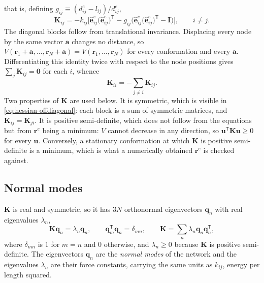 \documentclass[11pt]{article}
\newcommand{\rr}{\mathbf{r}}
\newcommand{\ee}{\hat{\mathbf{e}}}
\newcommand{\KK}{\mathbf{K}}
\newcommand{\re}{\rr^{e}}
\newcommand{\eeije}{\ee^{e}_{ij}}
\newcommand{\dije}{d^{e}_{ij}}
\newcommand{\gij}{g_{ij}}
\newcommand{\lij}{l_{ij}}
\newcommand{\kij}{k_{ij}}
\begin{document}
that is, defining $\gij \equiv (\dije - \lij)/\dije$,
\begin{equation}
\boxed{
\KK_{ij} = -\kij\Big[\eeije\big(\eeije\big)^{\mathsf T}
- \gij\Big(\eeije\big(\eeije\big)^{\mathsf T} - \mathbf{I}\Big)\Big],
\qquad i \ne j.
}
\label{eq:hessian-offdiagonal}
\end{equation}
The diagonal blocks follow from translational invariance.
Displacing every node by the same vector $\mathbf{a}$ changes no distance, so $V(\rr_1+\mathbf{a},\ldots,\rr_N+\mathbf{a}) = V(\rr_1,\ldots,\rr_N)$ for every conformation and every $\mathbf{a}$.
Differentiating this identity twice with respect to the node positions gives $\sum_j \KK_{ij} = \mathbf{0}$ for each $i$, whence
\begin{equation}
\boxed{
\KK_{ii} = -\sum_{j \ne i} \KK_{ij}.
}
\label{eq:hessian-diagonal}
\end{equation}
Two properties of $\KK$ are used below.
It is symmetric, which is visible in \eqref{eq:hessian-offdiagonal}: each block is a sum of symmetric matrices, and $\KK_{ij} = \KK_{ji}$.
It is positive semi-definite, which does not follow from the equations but from $\re$ being a minimum: $V$ cannot decrease in any direction, so $\mathbf{u}^{\mathsf T}\KK\mathbf{u} \ge 0$ for every $\mathbf{u}$.
Conversely, a stationary conformation at which $\KK$ is positive semi-definite is a minimum, which is what a numerically obtained $\re$ is checked against.



\subsection{Normal modes}
\label{sec:modes}

$\KK$ is real and symmetric, so it has $3N$ orthonormal eigenvectors $\mathbf{q}_n$ with real eigenvalues $\lambda_n$,
\begin{equation}
\KK \mathbf{q}_n = \lambda_n \mathbf{q}_n,
\qquad
\mathbf{q}_m^{\mathsf T} \mathbf{q}_n = \delta_{mn},
\qquad
\KK = \sum_n \lambda_n \mathbf{q}_n \mathbf{q}_n^{\mathsf T},
\label{eq:eigenproblem}
\end{equation}
where $\delta_{mn}$ is $1$ for $m=n$ and $0$ otherwise, and $\lambda_n \ge 0$ because $\KK$ is positive semi-definite.
The eigenvectors $\mathbf{q}_n$ are the \emph{normal modes} of the network and the eigenvalues $\lambda_n$ are their force constants, carrying the same units as $\kij$, energy per length squared.
\end{document}
